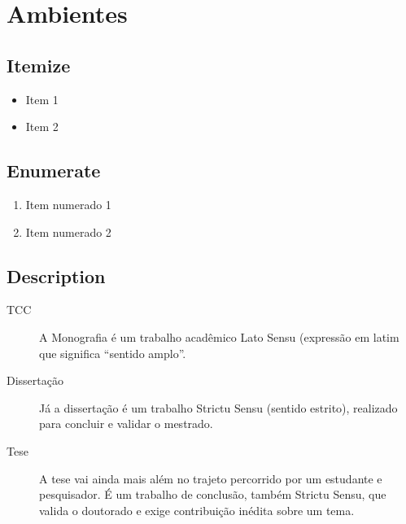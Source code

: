 \chapter{Ambientes}

\section{Itemize}

\begin{itemize}
    \item Item 1
    \item Item 2
\end{itemize}

\section{Enumerate}

\begin{enumerate}
    \item Item numerado 1
    \item Item numerado 2
\end{enumerate}

\section{Description}

\begin{description}
    \item[TCC] A Monografia é um trabalho acadêmico Lato Sensu (expressão em latim que significa “sentido amplo”. 
    \item[Dissertação] Já a dissertação é um trabalho Strictu Sensu (sentido estrito), realizado para concluir e validar o mestrado.
    \item[Tese] A tese vai ainda mais além no trajeto percorrido por um estudante e pesquisador. É um trabalho de conclusão, também Strictu Sensu, que valida o doutorado e exige contribuição inédita sobre um tema.
\end{description}

